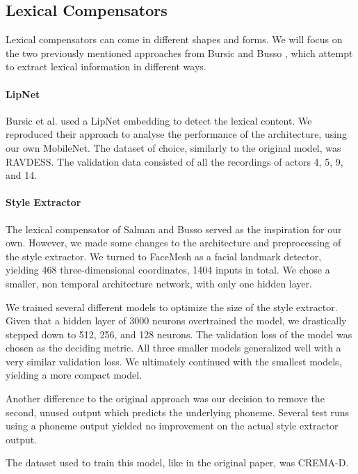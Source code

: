 \subsection{Lexical Compensators}
\label{sub:lex}
Lexical compensators can come in different shapes and forms. We will focus on the two previously mentioned approaches from Bursic \cite{bursic2020improving} and Busso \cite{salman2020style}, which attempt to extract lexical information in different ways.

\paragraph{LipNet} 
Bursic et al. \cite{bursic2020improving} used a LipNet embedding to detect the lexical content. We reproduced their approach to analyse the performance of the architecture, using our own MobileNet. The dataset of choice, similarly to the original model, was RAVDESS. The validation data consisted of all the recordings of actors 4, 5, 9, and 14.

\paragraph{Style Extractor}
The lexical compensator of Salman and Busso \cite{salman2020style} served as the inspiration for our own. However, we made some changes to the architecture and preprocessing of the style extractor. We turned to FaceMesh as a facial landmark detector, yielding 468 three-dimensional coordinates, 1404 inputs in total. We chose a smaller, non temporal architecture network, with only one hidden layer.

We trained several different models to optimize the size of the style extractor. Given that a hidden layer of 3000 neurons overtrained the model, we drastically stepped down to 512, 256, and 128 neurons. The validation loss of the model was chosen as the deciding metric. 
All three smaller models generalized well with a very similar validation loss. We ultimately continued with the smallest models, yielding a more compact model.

Another difference to the original approach was our decision to remove the second, unused output which predicts the underlying phoneme. Several test runs using a phoneme output yielded no improvement on the actual style extractor output.

The dataset used to train this model, like in the original paper, was CREMA-D.

